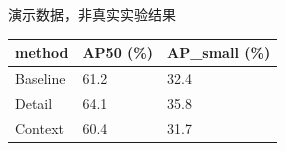 \textcolor{GMOrange}{演示数据，非真实实验结果}\par\medskip
\begin{tabular}{lll}
\toprule
method & AP50 (\%) & AP\_small (\%) \\
\midrule
Baseline & 61.2 & 32.4 \\
Detail & 64.1 & 35.8 \\
Context & 60.4 & 31.7 \\
\bottomrule
\end{tabular}
